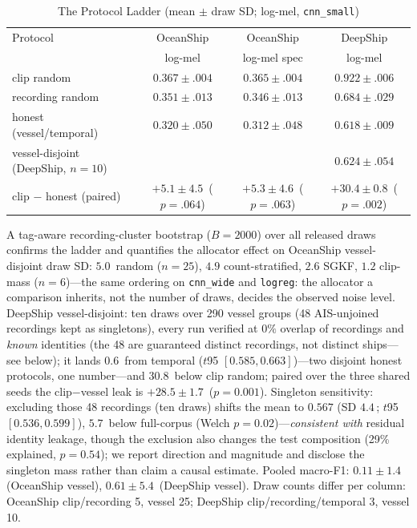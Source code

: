 ﻿\documentclass[journal]{IEEEtran}
\newcommand{\pp}{\,\text{pp}}
\begin{document}
\begin{table}[!t]
\caption{The Protocol Ladder (mean $\pm$ draw SD; log-mel, \texttt{cnn\_small})}
\label{tab:ladder}
\centering
\footnotesize\setlength{\tabcolsep}{6pt}
\begin{tabular}{lccc}
\toprule
Protocol & OceanShip & OceanShip & DeepShip \\
 & log-mel & log-mel spec & log-mel \\
\midrule
clip random      & $0.367\pm.004$ & $0.365\pm.004$ & $0.922\pm.006$ \\
recording random & $0.351\pm.013$ & $0.346\pm.013$ & $0.684\pm.029$ \\
honest (vessel/temporal) & $0.320\pm.050$ & $0.312\pm.048$ & $0.618\pm.009$ \\
vessel-disjoint (DeepShip, $n{=}10$) & & & $0.624\pm.054$ \\
\midrule
clip $-$ honest (paired) & $+5.1\pm4.5$\pp{} ($p{=}.064$) & $+5.3\pm4.6$\pp{} ($p{=}.063$) & $+30.4\pm0.8$\pp{} ($p{=}.002$) \\
\bottomrule
\end{tabular}
\vspace{2pt}

{\footnotesize A tag-aware recording-cluster bootstrap ($B{=}2000$) over all released draws
confirms the ladder and quantifies the allocator effect on OceanShip vessel-disjoint draw SD:
$5.0$\pp{} random ($n{=}25$), $4.9$ count-stratified, $2.6$ SGKF, $1.2$ clip-mass ($n{=}6$)—the
same ordering on \texttt{cnn\_wide} and \texttt{logreg}: the allocator a comparison inherits, not
the number of draws, decides the observed noise level. DeepShip vessel-disjoint: ten draws over 290 vessel
groups (48 AIS-unjoined recordings kept as singletons), every run verified at $0\%$ overlap of
recordings and \emph{known} identities (the 48 are guaranteed distinct recordings, not distinct
ships—see below); it lands $0.6$\pp{} from temporal ($t$95 $[0.585,0.663]$)---two disjoint honest
protocols, one number---and $30.8$\pp{} below clip random; paired over the three shared seeds the
clip$-$vessel leak is $+28.5\pm1.7$\pp{} ($p=0.001$). Singleton sensitivity: excluding those 48
recordings (ten draws) shifts the mean to $0.567$ (SD $4.4$\pp; $t$95 $[0.536,0.599]$), $5.7$\pp{}
below full-corpus (Welch $p=0.02$)---\emph{consistent with} residual identity leakage, though the
exclusion also changes the test composition (29\% explained, $p=0.54$); we report direction and
magnitude and disclose the singleton mass rather than claim a causal estimate. Pooled macro-F1:
$0.11\pm1.4$\pp{} (OceanShip vessel), $0.61\pm5.4$\pp{} (DeepShip vessel). Draw counts differ per
column: OceanShip clip/recording 5, vessel 25; DeepShip clip/recording/temporal 3, vessel 10.}
\end{table}
\end{document}
